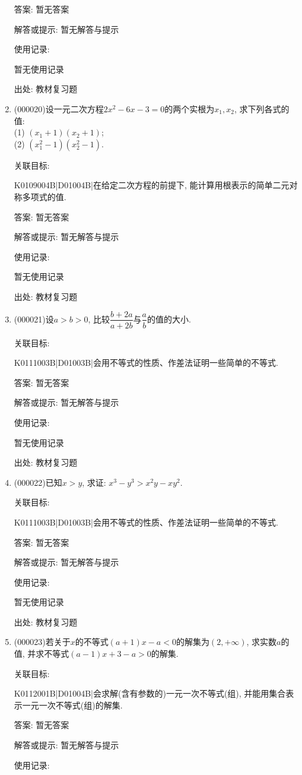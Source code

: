 \documentclass[10pt,a4paper]{article}
\begin{document}
\begin{enumerate}[1.]
答案: 暂无答案

解答或提示: 暂无解答与提示

使用记录:

暂无使用记录


出处: 教材复习题
\item { (000020)}设一元二次方程$2x^2-6x-3=0$的两个实根为$x_1,x_2$, 求下列各式的值:\\
(1) $(x_1+1)(x_2+1)$;\\
(2) $(x_1^2-1)(x_2^2-1)$.


关联目标:

K0109004B|D01004B|在给定二次方程的前提下, 能计算用根表示的简单二元对称多项式的值.

答案: 暂无答案

解答或提示: 暂无解答与提示

使用记录:

暂无使用记录


出处: 教材复习题
\item { (000021)}设$a>b>0$, 比较$\dfrac{b+2a}{a+2b}$与$\dfrac ab$的值的大小.


关联目标:

K0111003B|D01003B|会用不等式的性质、作差法证明一些简单的不等式.

答案: 暂无答案

解答或提示: 暂无解答与提示

使用记录:

暂无使用记录


出处: 教材复习题
\item { (000022)}已知$x>y$, 求证: $x^3-y^3>x^2y-xy^2$.


关联目标:

K0111003B|D01003B|会用不等式的性质、作差法证明一些简单的不等式.

答案: 暂无答案

解答或提示: 暂无解答与提示

使用记录:

暂无使用记录


出处: 教材复习题
\item { (000023)}若关于$x$的不等式$(a+1)x-a<0$的解集为$(2,+\infty)$, 求实数$a$的值, 并求不等式$(a-1)x+3-a>0$的解集.


关联目标:

K0112001B|D01004B|会求解(含有参数的)一元一次不等式(组), 并能用集合表示一元一次不等式(组)的解集.

答案: 暂无答案

解答或提示: 暂无解答与提示

使用记录:


\end{enumerate}
\end{document}
